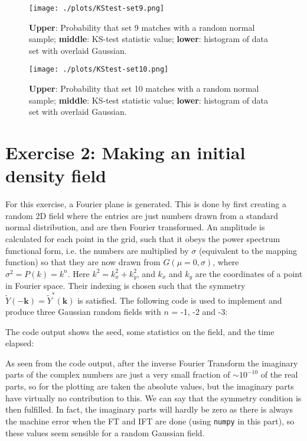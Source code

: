 \documentclass{article}
\begin{document}
\begin{figure}[!h]
\centering
\begin{minipage}[t]{7.6cm}
    \centering
    \texttt{[image: ./plots/KStest-set9.png]}
    \caption{\textbf{Upper}: Probability that set 9 matches with a random normal sample; \textbf{middle}: KS-test statistic value; \textbf{lower}: histogram of data set with overlaid Gaussian.}
    \label{fig:KS-9}
\end{minipage}%
\qquad
\begin{minipage}[t]{7.6cm}
    \centering
    \texttt{[image: ./plots/KStest-set10.png]}
    \caption{\textbf{Upper}: Probability that set 10 matches with a random normal sample; \textbf{middle}: KS-test statistic value; \textbf{lower}: histogram of data set with overlaid Gaussian. }
    \label{fig:KS-10}
\end{minipage}%
\end{figure}


\section{Exercise 2: Making an initial density field}
For this exercise, a Fourier plane is generated. This is done by first creating a random 2D field where the entries are just numbers drawn from a standard normal distribution, and are then Fourier transformed. An amplitude is calculated for each point in the grid, such that it obeys the power spectrum functional form, i.e. the numbers are multiplied by $\sigma$ (equivalent to the mapping function) so that they are now drawn from $G(\mu=0, \sigma)$, where $\sigma^2 = P(k) = k^n$. Here $k^2 = k_x^2+k_y^2$, and $k_x$ and $k_y$ are the coordinates of a point in Fourier space. Their indexing is chosen such that the symmetry $\widetilde{Y}(\mathbf{-k}) = \widetilde{Y}^*(\mathbf{k})$ is satisfied. The following code is used to implement and produce three Gaussian random fields with $n$ = -1, -2 and -3:


The code output shows the seed, some statistics on the field, and the time elapsed:


As seen from the code output, after the inverse Fourier Transform the imaginary parts of the complex numbers are just a very small fraction of $\sim 10^{-10}$ of the real parts, so for the plotting are taken the absolute values, but the imaginary parts have virtually no contribution to this. We can say that the symmetry condition is then fulfilled. In fact, the imaginary parts will hardly be zero as there is always the machine error when the FT and IFT are done (using \verb+numpy+ in this part), so these values seem sensible for a random Gaussian field.
\end{document}
